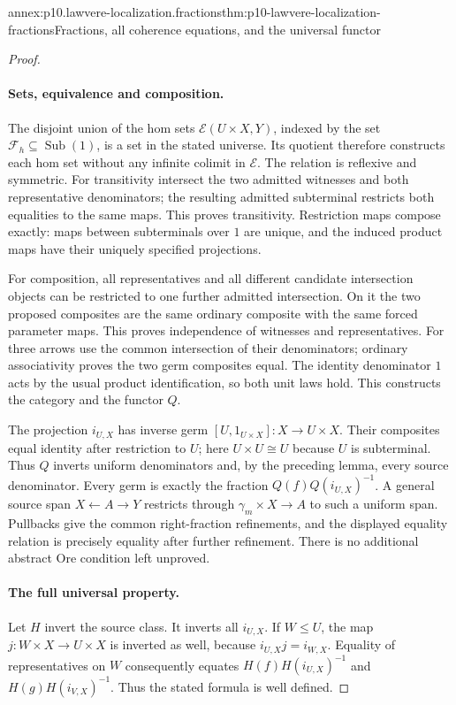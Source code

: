 \begin{annexitem}{annex:p10.lawvere-localization.fractions}{thm:p10-lawvere-localization-fractions}{Fractions, all coherence equations, and the universal functor}
\begin{proof}
\paragraph{Sets, equivalence and composition.}
The disjoint union of the hom sets
\(\mathcal E(U\times X,Y)\), indexed by the set
\(\mathcal F_h\subseteq\operatorname{Sub}(1)\),
is a set in the stated universe.  Its quotient
therefore constructs each hom set without any
infinite colimit in \(\mathcal E\).
The relation is reflexive and symmetric.  For
transitivity intersect the two admitted witnesses
and both representative denominators; the resulting
admitted subterminal restricts both equalities
to the same maps.  This proves transitivity.
Restriction maps compose exactly: maps between
subterminals over \(1\) are unique, and the
induced product maps have their uniquely specified
projections.

For composition, all representatives and all
different candidate intersection objects can be
restricted to one further admitted intersection.
On it the two proposed composites are the same
ordinary composite with the same forced parameter
maps.  This proves independence of witnesses and
representatives.  For three arrows use the common
intersection of their denominators; ordinary
associativity proves the two germ composites equal.
The identity denominator \(1\) acts by the usual
product identification, so both unit laws hold.
This constructs the category and the functor \(Q\).

The projection \(i_{U,X}\) has inverse germ
\([U,1_{U\times X}]:X\to U\times X\).
Their composites equal identity after restriction
to \(U\); here \(U\times U\cong U\) because
\(U\) is subterminal.  Thus \(Q\) inverts uniform
denominators and, by the preceding lemma, every
source denominator.
Every germ is exactly the fraction
\(Q(f)Q(i_{U,X})^{-1}\).  A general source span
\(X\leftarrow A\to Y\) restricts through
\(\gamma_m\times X\to A\) to such a uniform
span.  Pullbacks give the common right-fraction
refinements, and the displayed equality relation
is precisely equality after further refinement.
There is no additional abstract Ore condition
left unproved.

\paragraph{The full universal property.}
Let \(H\) invert the source class.  It inverts
all \(i_{U,X}\).  If \(W\leq U\), the map
\(j:W\times X\to U\times X\) is inverted
as well, because \(i_{U,X}j=i_{W,X}\).
Equality of representatives on \(W\) consequently
equates
\(H(f)H(i_{U,X})^{-1}\) and
\(H(g)H(i_{V,X})^{-1}\).
Thus the stated formula is well defined.


\end{proof}
\end{annexitem}
